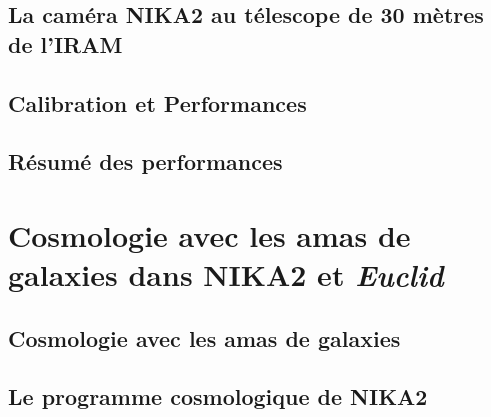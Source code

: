\documentclass[a4paper, 12pt]{report}
\begin{document}
\chapter{La caméra NIKA2 au télescope de 30 mètres de l'IRAM}
\label{chap:nika2iram}

%
%   
%
\chapter{Calibration et Performances}
\label{chap:calib_perf}


%
%   
%
\chapter{Résumé des performances}
\label{chap:nika2_resume}


%
%
%
%
%
%
%

\part{Cosmologie avec les amas de galaxies dans NIKA2 et \emph{Euclid}}

%
%
\chapter{Cosmologie avec les amas de galaxies}
\label{se:cosmo_general}



%
%
\chapter{Le programme cosmologique de NIKA2}
\label{se:cosmo_NIKA2}

\end{document}
